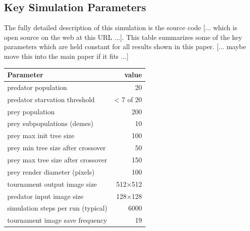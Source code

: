\documentclass[acmtog]{acmart}
\begin{document}

\subsection{Key Simulation Parameters}
The fully detailed description of this simulation is the source code [... which is open source on the web at this URL ...]. This table summarizes some of the key parameters which are held constant for all results shown in this paper. [... maybe move this into the main paper if it fits ...]
\par

\begin{adjustwidth}{1cm}{0cm}
    \vspace{0.3cm}
    \begin{tabular}{ |l|r| } 
        \hline
        \textbf{Parameter} & \textbf{value} \\ 
        \hline
        predator population & 20 \\ 
        predator starvation threshold & < 7 of 20 \\ 
        prey population & 200 \\ 
        prey subpopulations (demes) & 10 \\
        prey max init tree size & 100 \\
        prey min tree size after crossover & 50 \\
        prey max tree size after crossover & 150 \\
        \hline
        prey render diameter (pixels) & 100 \\ 
        tournament output image size & 512×512 \\ 
        predator input image size & 128×128 \\ 
        \hline
        simulation steps per run (typical) & 6000 \\
        tournament image save frequency & 19 \\
        \hline
    \end{tabular}
\end{adjustwidth}
\end{document}
